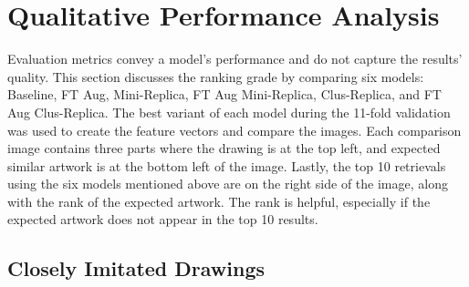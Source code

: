 \section{Qualitative Performance Analysis}

Evaluation metrics convey a model's performance and do not capture the results' quality. This section discusses the ranking grade by comparing six models: Baseline, FT Aug, Mini-Replica, FT Aug Mini-Replica, Clus-Replica, and FT Aug Clus-Replica. The best variant of each model during the 11-fold validation was used to create the feature vectors and compare the images. Each comparison image contains three parts where the drawing is at the top left, and expected similar artwork is at the bottom left of the image. Lastly, the top 10 retrievals using the six models mentioned above are on the right side of the image, along with the rank of the expected artwork. The rank is helpful, especially if the expected artwork does not appear in the top 10 results.


\subsection{Closely Imitated Drawings}

